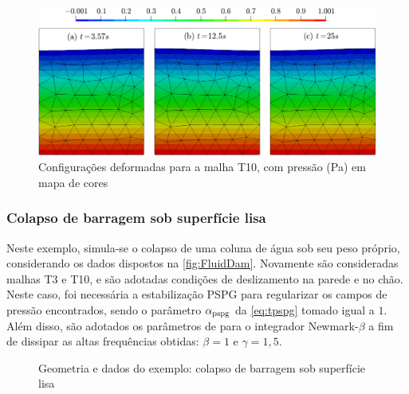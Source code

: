 \documentclass[Tese.tex]{subfiles}
\begin{document}
\begin{figure}[!htb]
	\centering
	\caption{Configurações deformadas para a malha T10, com pressão (Pa) em mapa de cores}
	\label{fig:FluidSloshT10}
	\includegraphics[scale=0.47]{Figuras/FluidSlosh/FluidSloshT10.png}
\end{figure}

\subsubsection{Colapso de barragem sob superfície lisa}\label{sec:barragem}

Neste exemplo, simula-se o colapso de uma coluna de água sob seu peso próprio, considerando os dados dispostos na \autoref{fig:FluidDam}. Novamente são consideradas malhas T3 e T10, e são adotadas condições de deslizamento na parede e no chão. Neste caso, foi necessária a estabilização PSPG para regularizar os campos de pressão encontrados, sendo o parâmetro $\alpha_\text{pspg}$ da \cref{eq:tpspg} tomado igual a $1$. Além disso, são adotados os parâmetros de  para o integrador Newmark-$\beta$ a fim de dissipar as altas frequências obtidas: $\beta = 1$ e $\gamma = 1,5$.

\begin{figure}[!htb]
	\centering
	\caption{Geometria e dados do exemplo: colapso de barragem sob superfície lisa}
	\label{fig:FluidDam}
	{\small
		\noindent{}
	}	
\end{figure}
\end{document}
